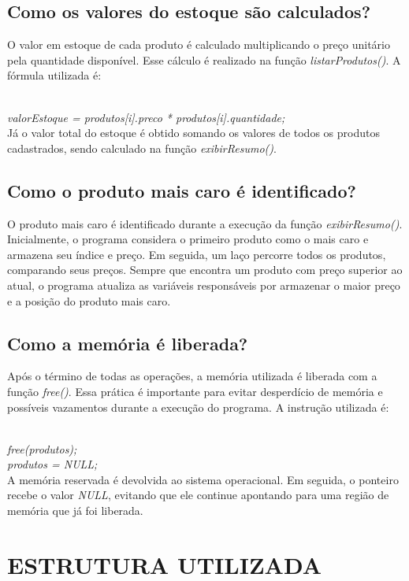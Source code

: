 \documentclass[12pt, a4paper, brazil]{article}
\begin{document}
\subsection{Como os valores do estoque são calculados?}

O valor em estoque de cada produto é calculado multiplicando o preço unitário pela quantidade disponível. Esse cálculo é realizado na função \textit{listarProdutos()}.
A fórmula utilizada é:

\textit{\\valorEstoque = produtos[i].preco * produtos[i].quantidade;}\\

Já o valor total do estoque é obtido somando os valores de todos os produtos cadastrados, sendo calculado na função \textit{exibirResumo()}.

\subsection{Como o produto mais caro é identificado?}

O produto mais caro é identificado durante a execução da função \textit{exibirResumo()}. Inicialmente, o programa considera o primeiro produto como o mais caro e armazena seu índice e preço.
Em seguida, um laço percorre todos os produtos, comparando seus preços. Sempre que encontra um produto com preço superior ao atual, o programa atualiza as variáveis responsáveis por armazenar o maior preço e a posição do produto mais caro.

\subsection{Como a memória é liberada?}

Após o término de todas as operações, a memória utilizada é liberada com a função \textit{free()}. Essa prática é importante para evitar desperdício de memória e possíveis vazamentos durante a execução do programa. A instrução utilizada é:

\textit{\\free(produtos);\\
produtos = NULL;}\\


A memória reservada é devolvida ao sistema operacional. Em seguida, o ponteiro recebe o valor \textit{NULL}, evitando que ele continue apontando para uma região de memória que já foi liberada.

\section{ESTRUTURA UTILIZADA}
\end{document}
